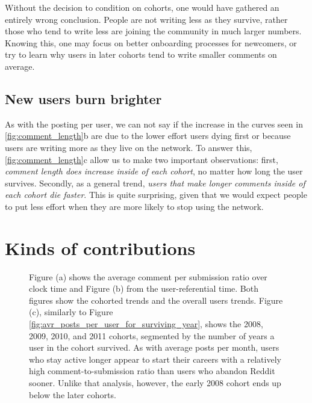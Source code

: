 Without the decision to condition on cohorts, one would have gathered an entirely wrong conclusion. People are not writing less as they survive, rather those who tend to write less are joining the community in much larger numbers. Knowing this, one may focus on better onboarding processes for newcomers, or try to learn why users in later cohorts tend to write smaller comments on average.  

\subsection{New users burn brighter}
As with the posting per user, we can not say if the increase in the curves seen in \ref{fig:comment_length}b are due to the lower effort users dying first or because users are writing more as they live on the network. To answer this, \ref{fig:comment_length}c allow us to make two important observations: first, \textit{comment length does increase inside of each cohort}, no matter how long the user survives. Secondly, as a general trend, \textit{users that make longer comments inside of each cohort die faster}. This is quite surprising, given that we would expect people to put less effort when they are more likely to stop using the network.

\section{Kinds of contributions}

\begin{figure*}[!tb]
\centering
{}
\caption{Figure (a) shows the average comment per submission ratio over clock time and Figure (b) from the user-referential time. Both figures show the cohorted trends and the overall users trends. Figure (c), similarly to Figure \ref{fig:avr_posts_per_user_for_surviving_year}, shows the 2008, 2009, 2010, and 2011 cohorts, segmented by the number of years a user in the cohort survived.  As with average posts per month, users who stay active longer appear to start their careers with a relatively high comment-to-submission ratio than users who abandon Reddit sooner.  Unlike that analysis, however, the early 2008 cohort ends up below the later cohorts.}
\label{fig:comments_submissions}
\end{figure*}

